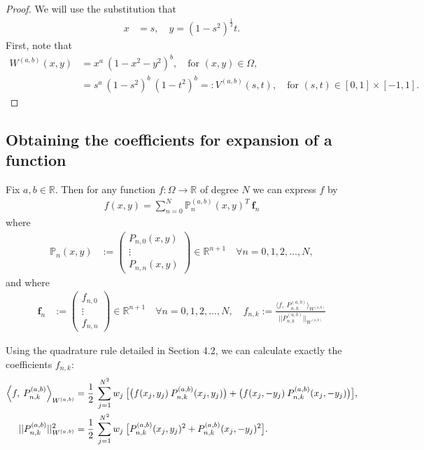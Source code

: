 \documentclass[11pt, oneside]{article}   	%
\newcommand{\half}{\frac{1}{2}}
\newcommand{\R}{\mathbb{R}}
\newcommand{\bigP}{\mathbb{P}}
\newcommand{\Pnk}{P_{n,k}}
\begin{document}
\begin{proof}
We will use the substitution that
\begin{align}
x &= s, \quad y = (1-s^2)^\half t.
\end{align}
First, note that
\begin{align}
W^{(a,b)}(x,y) &= x^a \: (1-x^2-y^2)^b, \quad \text{for } (x,y) \in \Omega, \\
		      &= s^a \: (1-s^2)^{b} \: (1-t^2)^b =: V^{(a,b)}(s,t), \quad \text{for } (s,t) \in [0,1] \times [-1,1].
\end{align}
\end{proof}




\subsection{Obtaining the coefficients for expansion of a function}

Fix \(a,b \in \R\). Then for any function \(f : \Omega \to \R\) of degree $N$ we can express \(f\) by
\begin{align*}
f(x,y) = \sum_{n=0}^N \bigP_n^{(a,b)}(x,y)^T \: \mathbf{f}_n
\end{align*}
where
\begin{align*}
\bigP_n(x,y) &:= \begin{pmatrix}
		P_{n,0}(x,y) \\
		\vdots \\
		P_{n,n}(x,y)
	\end{pmatrix} \in \R^{n+1} \quad \forall n = 0,1,2,\dots,N,
\end{align*}
and where
\begin{align*}
\mathbf{f}_n &:= \begin{pmatrix}
		f_{n,0} \\
		\vdots \\
		f_{n,n}
	\end{pmatrix} \in \R^{n+1} \quad \forall n = 0,1,2,\dots,N, \quad
f_{n,k} := \frac{\langle f, \: \Pnk^{(a,b)} \rangle_{W^{(a,b)}}}{|| \Pnk^{(a,b)} ||_{W^{(a,b)}}}
\end{align*}

Using the quadrature rule detailed in Section 4.2, we can calculate exactly the coefficients $f_{n,k}$:
\begin{align}
\ip< f, \: \Pnk^{(a,b)} >_{W^{(a,b)}} &= \half \: \sum_{j=1}^{N^2} w_j \: \big[ \big(f(x_j, y_j) \: \Pnk^{(a,b)}(x_j, y_j)\big) +\big(f(x_j, -y_j) \: \Pnk^{(a,b)}(x_j, -y_j)\big) \big], \\
|| \Pnk^{(a,b)} ||_{W^{(a,b)}}^2 &= \half \: \sum_{j=1}^{N^2} w_j \: \big[ \Pnk^{(a,b)}(x_j, y_j)^2 + \Pnk^{(a,b)}(x_j, -y_j)^2 \big].
\end{align}
\end{document}
